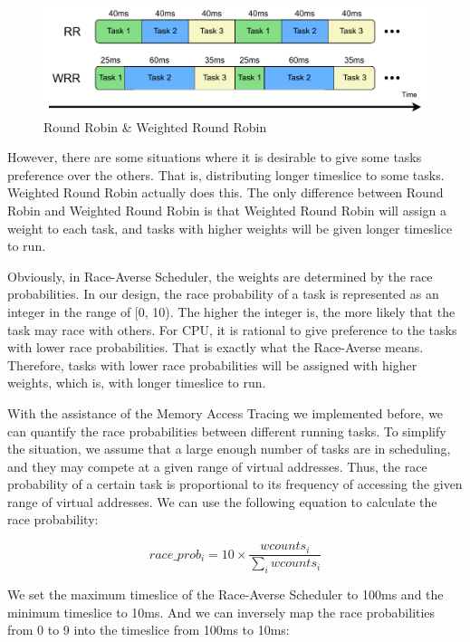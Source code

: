 \begin{figure}[!htp]
  \centering
  \includegraphics[width=12cm]{figures/wrr.drawio.pdf}
  \caption{Round Robin \& Weighted Round Robin}
\end{figure}

However, there are some situations where it is desirable to give some tasks preference over the others. That is, distributing longer timeslice to some tasks. Weighted Round Robin actually does this. The only difference between Round Robin and Weighted Round Robin is that Weighted Round Robin will assign a weight to each task, and tasks with higher weights will be given longer timeslice to run.

Obviously, in Race-Averse Scheduler, the weights are determined by the race probabilities. In our design, the race probability of a task is represented as an integer in the range of [0, 10). The higher the integer is, the more likely that the task may race with others. For CPU, it is rational to give preference to the tasks with lower race probabilities. That is exactly what the Race-Averse means. Therefore, tasks with lower race probabilities will be assigned with higher weights, which is, with longer timeslice to run. 

With the assistance of the Memory Access Tracing we implemented before, we can quantify the race probabilities between different running tasks. To simplify the situation, we assume that a large enough number of tasks are in scheduling, and they may compete at a given range of virtual addresses. Thus, the race probability of a certain task is proportional to its frequency of accessing the given range of virtual addresses. We can use the following equation to calculate the race probability:

\begin{equation}
    race\_prob_i = 10\times\frac{wcounts_i}{\sum_{i}wcounts_i}
\end{equation}

We set the maximum timeslice of the Race-Averse Scheduler to 100ms and the minimum timeslice to 10ms. And we can inversely map the race probabilities from 0 to 9 into the timeslice from 100ms to 10ms:


